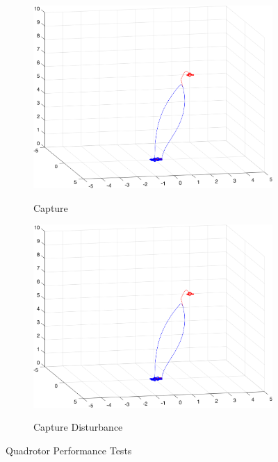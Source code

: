 \documentclass{article}
\begin{document}
\begin{multicols}{2}
\begin{figure}[H]
\begin{subfigure}[b]{0.45\columnwidth}
    \centering
    \includegraphics[width = 1\textwidth]{images/Intercept.png}
     \label{fig:Capture}
     \vspace{-5mm}
     \caption{Capture}
 \end{subfigure}
 \begin{subfigure}[b]{0.45\columnwidth}
    \centering
    \includegraphics[width = 1\textwidth]{images/Intercept.png}
     \label{fig:CaptureW}
     \vspace{-5mm}
     \caption{Capture Disturbance}
 \end{subfigure}
   \caption{Quadrotor Performance Tests}
\end{figure}


\end{multicols}
\end{document}
